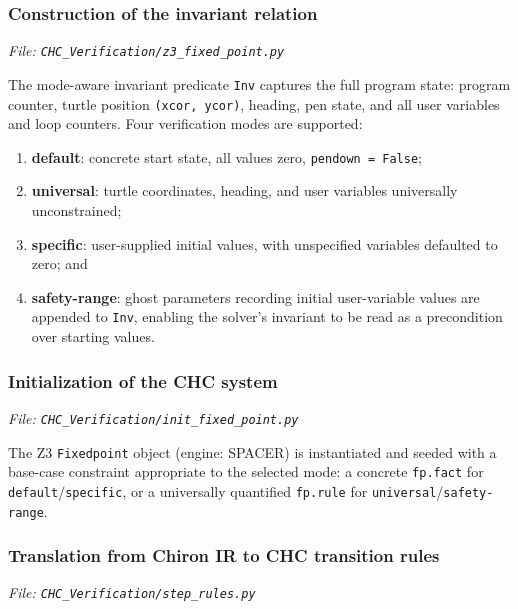 \subsubsection*{Construction of the invariant relation}
\noindent\textit{\small File: \texttt{CHC\_Verification/z3\_fixed\_point.py}}

The mode-aware invariant predicate \texttt{Inv} captures the full program state: program counter, turtle position \texttt{(xcor, ycor)}, heading, pen state, and all user variables and loop counters. Four verification modes are supported:
\begin{enumerate}[leftmargin=1.5em]
    \item \textbf{default}: concrete start state, all values zero, \texttt{pendown = False};
    \item \textbf{universal}: turtle coordinates, heading, and user variables universally unconstrained;
    \item \textbf{specific}: user-supplied initial values, with unspecified variables defaulted to zero; and
    \item \textbf{safety-range}: ghost parameters recording initial user-variable values are appended to \texttt{Inv}, enabling the solver's invariant to be read as a precondition over starting values.
\end{enumerate}

\subsubsection*{Initialization of the CHC system}
\noindent\textit{\small File: \texttt{CHC\_Verification/init\_fixed\_point.py}}

The Z3 \texttt{Fixedpoint} object (engine: SPACER) is instantiated and seeded with a base-case constraint appropriate to the selected mode: a concrete \texttt{fp.fact} for \texttt{default}/\texttt{specific}, or a universally quantified \texttt{fp.rule} for \texttt{universal}/\texttt{safety-range}.

\subsubsection*{Translation from Chiron IR to CHC transition rules}
\noindent\textit{\small File: \texttt{CHC\_Verification/step\_rules.py}}


